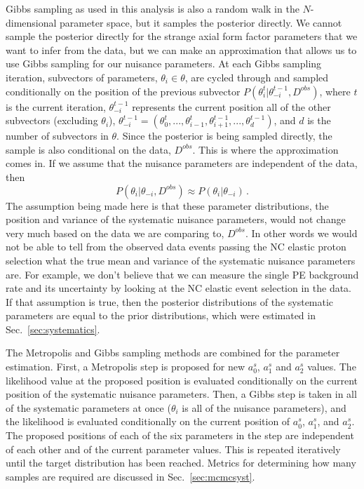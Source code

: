     Gibbs sampling as used in this analysis is also a random walk in the
    $N$-dimensional parameter space, but it samples the posterior directly. We
    cannot sample the posterior directly for the strange axial form factor
    parameters that we want to infer from the data, but we can make an
    approximation that allows us to use Gibbs sampling for our nuisance
    parameters. At each Gibbs sampling iteration, subvectors of parameters,
    $\theta_i \in \theta$, are cycled through and sampled conditionally on the
    position of the previous subvector
    $P(\theta_i^t|\theta_{-i}^{t-1},D^{obs})$, where $t$ is the current
    iteration, $\theta_{-i}^{t-1}$ represents the current position all of the
    other subvectors (excluding $\theta_i$), $\theta_{-i}^{t-1} =
    (\theta_0^t,...,\theta_{i-1}^t,\theta_{i+1}^{t-1},...,\theta_d^{t-1})$, and
    $d$ is the number of subvectors in $\theta$.  Since the posterior is being
    sampled directly, the sample is also conditional on the data, $D^{obs}$.
    This is where the approximation comes in. If we assume that the nuisance
    parameters are independent of the data, then
    \begin{equation}\label{eq:gibbsstep}
      P(\theta_i|\theta_{-i},D^{obs}) \approx P(\theta_i|\theta_{-i}) \,.
    \end{equation}
    The assumption being made here is that these parameter distributions, the
    position and variance of the systematic nuisance parameters, would not
    change very much based on the data we are comparing to, $D^{obs}$. In other
    words we would not be able to tell from the observed data events passing
    the NC elastic proton selection what the true mean and variance of the
    systematic nuisance parameters are. For example, we don't believe that we
    can measure the single PE background rate and its uncertainty by looking at
    the NC elastic event selection in the data. If that assumption is true,
    then the posterior distributions of the systematic parameters are equal to
    the prior distributions, which were estimated in
    Sec.~\ref{sec:systematics}.

    The Metropolis and Gibbs sampling methods are combined for the parameter
    estimation.  First, a Metropolis step is proposed for new $a_0^s$, $a_1^s$
    and $a_2^s$ values. The likelihood value at the proposed position is
    evaluated conditionally on the current position of the systematic nuisance
    parameters.  Then, a Gibbs step is taken in all of the systematic
    parameters at once ($\theta_i$ is all of the nuisance parameters), and the
    likelihood is evaluated conditionally on the current position of $a_0^s$,
    $a_1^s$, and $a_2^s$. The proposed positions of each of the six parameters
    in the step are independent of each other and of the current parameter
    values.  This is repeated iteratively until the target distribution has
    been reached. Metrics for determining how many samples are required are
    discussed in Sec.~\ref{sec:mcmcsyst}.


